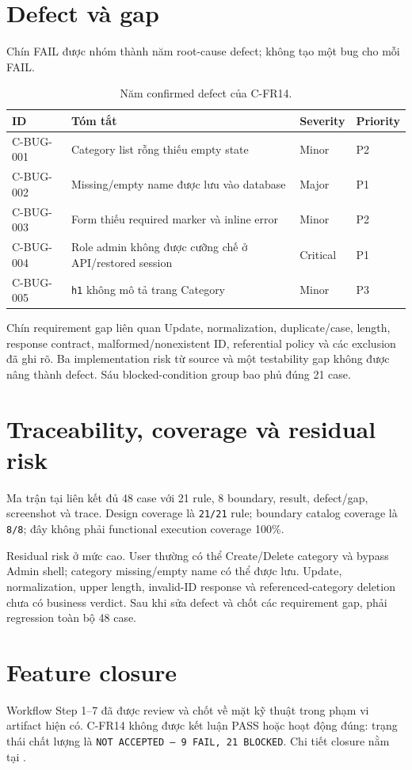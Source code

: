 \section{Defect và gap}

Chín FAIL được nhóm thành năm root-cause defect; không tạo một bug cho mỗi FAIL.

\begin{table}[H]
  \centering
  \small
  \begin{tabular}{p{}p{}p{}p{}}
    \toprule
    ID & Tóm tắt & Severity & Priority \\
    \midrule
    C-BUG-001 & Category list rỗng thiếu empty state & Minor & P2 \\
    C-BUG-002 & Missing/empty name được lưu vào database & Major & P1 \\
    C-BUG-003 & Form thiếu required marker và inline error & Minor & P2 \\
    C-BUG-004 & Role admin không được cưỡng chế ở API/restored session & Critical & P1 \\
    C-BUG-005 & \texttt{h1} không mô tả trang Category & Minor & P3 \\
    \bottomrule
  \end{tabular}
  \caption{Năm confirmed defect của C-FR14.}
\end{table}

Chín requirement gap liên quan Update, normalization, duplicate/case, length,
response contract, malformed/nonexistent ID, referential policy và các exclusion
đã ghi rõ. Ba implementation risk từ source và một testability gap không được
nâng thành defect. Sáu blocked-condition group bao phủ đúng 21 case.

\section{Traceability, coverage và residual risk}

Ma trận tại  liên kết đủ 48 case với
21 rule, 8 boundary, result, defect/gap, screenshot và trace. Design coverage là
\texttt{21/21} rule; boundary catalog coverage là \texttt{8/8}; đây không phải
functional execution coverage 100\%.

Residual risk ở mức cao. User thường có thể Create/Delete category và bypass
Admin shell; category missing/empty name có thể được lưu. Update, normalization,
upper length, invalid-ID response và referenced-category deletion chưa có
business verdict. Sau khi sửa defect và chốt các requirement gap, phải regression
toàn bộ 48 case.

\section{Feature closure}

Workflow Step 1--7 đã được review và chốt về mặt kỹ thuật trong phạm vi artifact
hiện có. C-FR14 không được kết luận PASS hoặc hoạt động đúng: trạng thái chất
lượng là \texttt{NOT ACCEPTED --- 9 FAIL, 21 BLOCKED}. Chi tiết closure nằm tại
.
